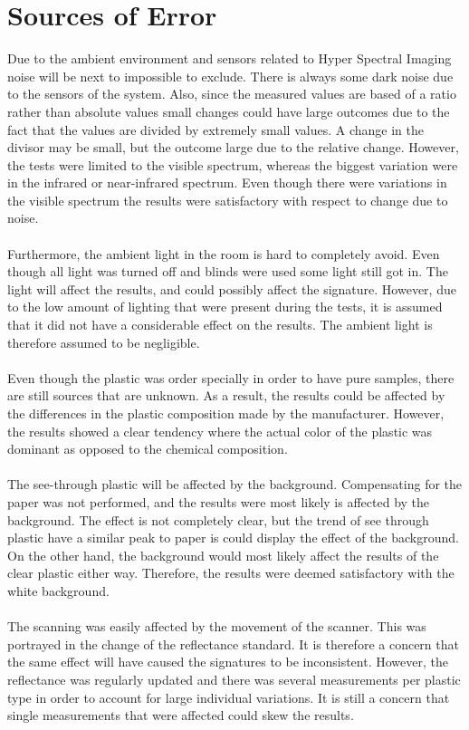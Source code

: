\section{Sources of Error}
Due to the ambient environment and sensors related to Hyper Spectral Imaging noise will be next to impossible to exclude. There is always some dark noise due to the sensors of the system. Also, since the measured values are based of a ratio rather than absolute values small changes could have large outcomes due to the fact that the values are divided by extremely small values. A change in the divisor may be small, but the outcome large due to the relative change. However, the tests were limited to the visible spectrum, whereas the biggest variation were in the infrared or near-infrared spectrum. Even though there were variations in the visible spectrum the results were satisfactory with respect to change due to noise. 
\\\\
Furthermore, the ambient light in the room is hard to completely avoid. Even though all light was turned off and blinds were used some light still got in. The light will affect the results, and could possibly affect the signature. However, due to the low amount of lighting that were present during the tests, it is assumed that it did not have a considerable effect on the results. The ambient light is therefore assumed to be negligible. 
\\\\
Even though the plastic was order specially in order to have pure samples, there are still sources that are unknown. As a result, the results could be affected by the differences in the plastic composition made by the manufacturer. However, the results showed a clear tendency where the actual color of the plastic was dominant as opposed to the chemical composition.
\\\\
The see-through plastic will be affected by the background. Compensating for the paper was not performed, and the results were most likely is affected by the background. The effect is not completely clear, but the trend of see through plastic have a similar peak to paper is could display the effect of the background. On the other hand, the background would most likely affect the results of the clear plastic either way. Therefore, the results were deemed satisfactory with the white background.
\\\\
The scanning was easily affected by the movement of the scanner. This was portrayed in the change of the reflectance standard. It is therefore a concern that the same effect will have caused the signatures to be inconsistent. However, the reflectance was regularly updated and there was several measurements per plastic type in order to account for large individual variations. It is still a concern that single measurements that were affected could skew the results.
\\\\


